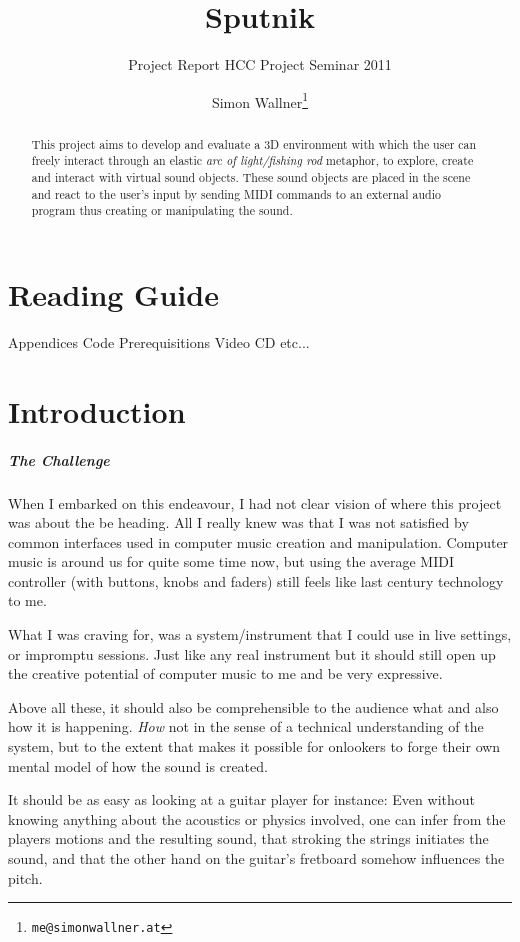 \documentclass[10pt,a4paper]{scrartcl}
\title{Sputnik}
\subtitle{Project Report HCC Project Seminar 2011}
\author{Simon Wallner\footnote{\texttt{me@simonwallner.at}}}
\begin{document}
\maketitle

\begin{abstract}
This project aims to develop and evaluate a 3D environment with which the user can freely interact through an elastic \emph{arc of light/fishing rod} metaphor, to explore, create and interact with virtual sound objects. These sound objects are placed in the scene and react to the user's input by sending MIDI commands to an external audio program thus creating or manipulating the sound.

\end{abstract}

\section{Reading Guide}
Appendices
Code
Prerequisitions
Video
CD
etc...


\section{Introduction}
\subparagraph{The Challenge}
When I embarked on this endeavour, I had not clear vision of where this project was about the be heading. All I really knew was that I was not satisfied by common interfaces used in computer music creation and manipulation. Computer music is around us for quite some time now, but using the average MIDI controller (with buttons, knobs and faders) still feels like last century technology to me. 

What I was craving for, was a system/instrument that I could use in live settings, or impromptu sessions. Just like any real instrument but it should still open up the creative potential of computer music to me and be very expressive.

Above all these, it should also be comprehensible to the audience what and also how it is happening. \emph{How} not in the sense of a technical understanding of the system, but to the extent that makes it possible for onlookers to forge their own mental model of how the sound is created. 

It should be as easy as looking at a guitar player for instance: Even without knowing anything about the acoustics or physics involved, one can infer from the players motions and the resulting sound, that stroking the strings initiates the sound, and that the other hand on the guitar's fretboard somehow influences the pitch.
\end{document}
